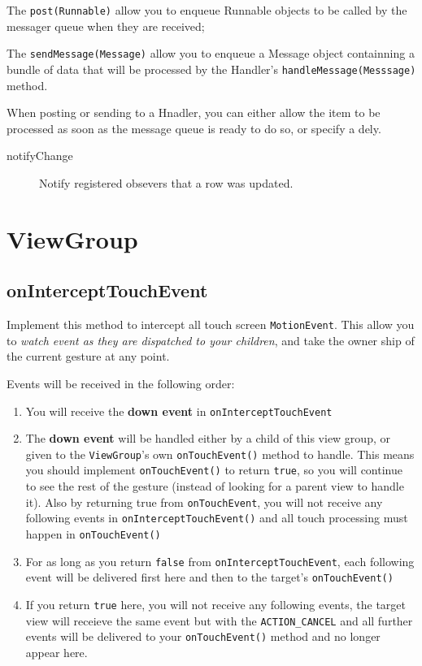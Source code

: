 \documentclass[11pt, a4paper]{book}
\begin{document}
The \verb|post(Runnable)| allow you to enqueue Runnable objects to be called by
the messager queue when they are received;

The \verb|sendMessage(Message)| allow you to enqueue a Message object
containning a bundle of data that will be processed by the Handler's
\verb|handleMessage(Messsage)| method.

When posting or sending to a Hnadler, you can either allow the item to be
processed as soon as the message queue is ready to do so, or specify a dely. 
\begin{description}
\item[notifyChange] Notify registered obsevers that a row was updated. 
\end{description}
\section{ViewGroup}
\subsection{onInterceptTouchEvent}
Implement this method to intercept all touch screen \verb|MotionEvent|. This
allow you to \emph{watch event as they are dispatched to your children}, and
take the owner ship of the current gesture at any point.

Events will be received in the following order:
\begin{enumerate}
\item You will receive the \textbf{down event} in \verb|onInterceptTouchEvent|
\item The \textbf{down event} will be handled either by a child of this view
group, or given to the \verb|ViewGroup|'s own \verb|onTouchEvent()| method to
handle. This means you should implement \verb|onTouchEvent()| to return
\verb|true|, so you will continue to see the rest of the gesture (instead of
looking for a parent view to handle it). Also by returning true from
\verb|onTouchEvent|, you will not receive any following events in
\verb|onInterceptTouchEvent()| and all touch processing must happen in
\verb|onTouchEvent()|
\item For as long as you return \verb|false| from \verb|onInterceptTouchEvent|,
each following event will be delivered first here and then to the target's
\verb|onTouchEvent()|
\item If you return \verb|true| here, you will not receive any following events,
the target view will receieve the same event but with the \verb|ACTION_CANCEL|
and all further events will be delivered to your \verb|onTouchEvent()| method
and no longer appear here.
\end{enumerate}
\end{document}
